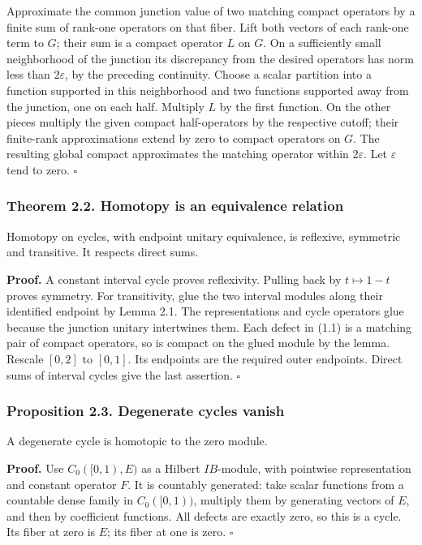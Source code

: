 \documentclass[
  11pt,
]{article}
\begin{document}
Approximate the common junction value of two matching compact operators
by a finite sum of rank-one operators on that fiber. Lift both vectors
of each rank-one term to \(G\); their sum is a compact operator \(L\) on
\(G\). On a sufficiently small neighborhood of the junction its
discrepancy from the desired operators has norm less than
\(2\varepsilon\), by the preceding continuity. Choose a scalar partition
into a function supported in this neighborhood and two functions
supported away from the junction, one on each half. Multiply \(L\) by
the first function. On the other pieces multiply the given compact
half-operators by the respective cutoff; their finite-rank
approximations extend by zero to compact operators on \(G\). The
resulting global compact approximates the matching operator within
\(2\varepsilon\). Let \(\varepsilon\) tend to zero. \(\square\)

\subsubsection{Theorem 2.2. Homotopy is an equivalence
relation}\label{theorem-2.2.-homotopy-is-an-equivalence-relation}

Homotopy on cycles, with endpoint unitary equivalence, is reflexive,
symmetric and transitive. It respects direct sums.

\textbf{Proof.} A constant interval cycle proves reflexivity. Pulling
back by \(t\mapsto1-t\) proves symmetry. For transitivity, glue the two
interval modules along their identified endpoint by Lemma 2.1. The
representations and cycle operators glue because the junction unitary
intertwines them. Each defect in (1.1) is a matching pair of compact
operators, so is compact on the glued module by the lemma. Rescale
\([0,2]\) to \([0,1]\). Its endpoints are the required outer endpoints.
Direct sums of interval cycles give the last assertion. \(\square\)

\subsubsection{Proposition 2.3. Degenerate cycles
vanish}\label{proposition-2.3.-degenerate-cycles-vanish}

A degenerate cycle is homotopic to the zero module.

\textbf{Proof.} Use \(C_0([0,1),E)\) as a Hilbert \(IB\)-module, with
pointwise representation and constant operator \(F\). It is countably
generated: take scalar functions from a countable dense family in
\(C_0([0,1))\), multiply them by generating vectors of \(E\), and then
by coefficient functions. All defects are exactly zero, so this is a
cycle. Its fiber at zero is \(E\); its fiber at one is zero. \(\square\)
\end{document}
